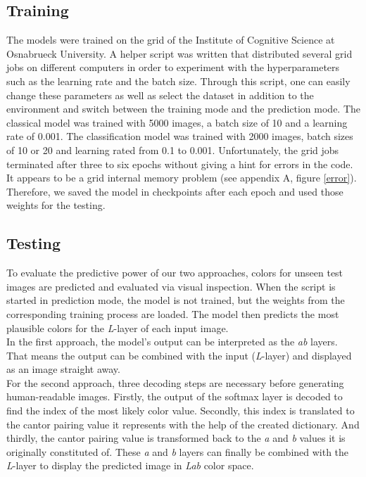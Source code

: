 \documentclass[12pt,letterpaper]{article}
\begin{document}
\subsection{Training}
The models were trained on the grid of the Institute of Cognitive Science at Osnabrueck University. A helper script was written that distributed several grid jobs on different computers in order to experiment with the hyperparameters such as the learning rate and the batch size. Through this script, one can easily change these parameters as well as select the dataset in addition to the environment and switch between the training mode and the prediction mode. The classical model was trained with 5000 images, a batch size of 10 and a learning rate of 0.001. The classification model was trained with 2000 images, batch sizes of 10 or 20 and learning rated from 0.1 to 0.001. Unfortunately, the grid jobs terminated after three to six epochs without giving a hint for errors in the code. It appears to be a grid internal memory problem (see appendix A, figure \ref{error}). Therefore, we saved the model in checkpoints after each epoch and used those weights for the testing.

\subsection{Testing}
To evaluate the predictive power of our two approaches, colors for unseen test images are predicted and evaluated via visual inspection. When the script is started in prediction mode, the model is not trained, but the weights from the corresponding training process are loaded. The model then predicts the most plausible colors for the \emph{L}-layer of each input image.\\
In the first approach, the model's output can be interpreted as the \emph{ab} layers. That means the output can be combined with the input (\emph{L}-layer) and displayed as an image straight away.\\
For the second approach, three decoding steps are necessary before generating human-readable images. Firstly, the output of the softmax layer is decoded to find the index of the most likely color value. Secondly, this index is translated to the cantor pairing value it represents with the help of the created dictionary. And thirdly, the cantor pairing value is transformed back to the \emph{a} and \emph{b} values it is originally constituted of. These \emph{a} and \emph{b} layers can finally be combined with the \emph{L}-layer to display the predicted image in \emph{Lab} color space.\\
\end{document}

